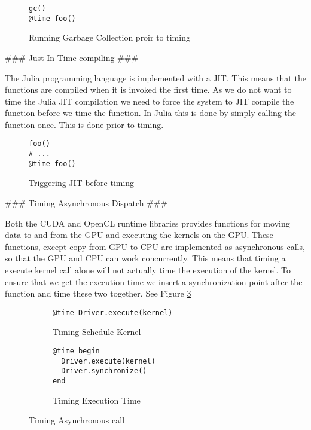 \begin{markdown}
\begin{figure}
  \begin{verbatim}
gc()
@time foo()    
  \end{verbatim}
  \caption{Running Garbage Collection proir to timing}
\end{figure}

### Just-In-Time compiling ###

The Julia programming language is implemented with a \gls{JIT}. This
means that the functions are compiled when it is invoked the first
time. As we do not want to time the Julia \gls{JIT} compilation we
need to force the system to \gls{JIT} compile the function before we
time the function. In Julia this is done by simply calling the
function once. This is done prior to timing.


\begin{figure}
  \begin{verbatim}
foo()
# ...
@time foo()
  \end{verbatim}
  \caption{Triggering JIT before timing}
\end{figure}

### Timing Asynchronous Dispatch ###

Both the \gls{CUDA} and \gls{OpenCL} runtime libraries provides
functions for moving data to and from the GPU and executing the
kernels on the \gls{GPU}. These functions, except copy from GPU to CPU
are implemented as asynchronous calls, so that the GPU and CPU can
work concurrently. This means that timing a execute kernel call alone
will not actually time the execution of the kernel. To ensure that we
get the execution time we insert a synchronization point after the
function and time these two together. See Figure \ref{fig:disc:async-call}


\begin{figure}[H]
  \begin{subfigure}{.49\textwidth}
    \begin{verbatim}
@time Driver.execute(kernel)
    \end{verbatim}
    \caption{Timing Schedule Kernel}
    \label{fig:disc:async-call:sched}
  \end{subfigure}

  \begin{subfigure}{.49\textwidth}
    \begin{verbatim}
@time begin
  Driver.execute(kernel)
  Driver.synchronize()
end
    \end{verbatim}
    \caption{Timing Execution Time}
    \label{fig:disc:async-call:exec}
  \end{subfigure}

  \caption{Timing Asynchronous call}
  \label{fig:disc:async-call}
  
\end{figure}

\end{markdown}
